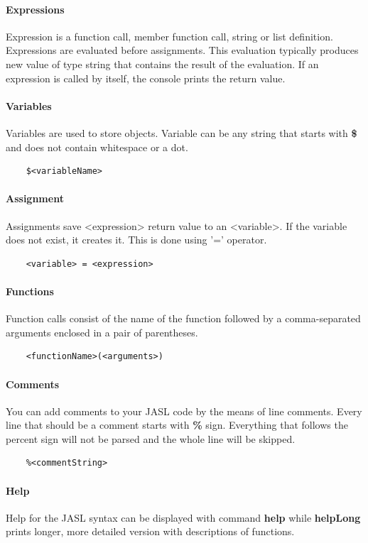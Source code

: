 \documentclass{ctuthesis}
\begin{document}
\paragraph{Expressions}
Expression is a function call, member function call, string or list definition. Expressions are evaluated before assignments. This evaluation typically produces new value of type string that contains the result of the evaluation. If an expression is called by itself, the console prints the return value.

\paragraph{Variables}
Variables are used to store objects. Variable can be any string that starts with \textbf{\$} and does not contain whitespace or a dot.
\begin{verbatim}
	$<variableName>
\end{verbatim}

\paragraph{Assignment}
Assignments save <expression> return value to an <variable>. If the variable does not exist, it creates it. This is done using '=' operator.
\begin{verbatim}
	<variable> = <expression>
\end{verbatim} 


\paragraph{Functions}
Function calls consist of the name of the function followed by a comma-separated arguments enclosed in a pair of parentheses. 
\begin{verbatim}
	<functionName>(<arguments>)
\end{verbatim}

\paragraph{Comments}
You can add comments to your JASL code by the means of line comments. Every line that should be a comment starts with \textbf{\%} sign. Everything that follows the percent sign will not be parsed and the whole line will be skipped. 
\begin{verbatim}
	%<commentString>
\end{verbatim}

\paragraph{Help}
Help for the JASL syntax can be displayed with command \textbf{help} while \textbf{helpLong} prints longer, more detailed version with descriptions of functions. 
\end{document}
